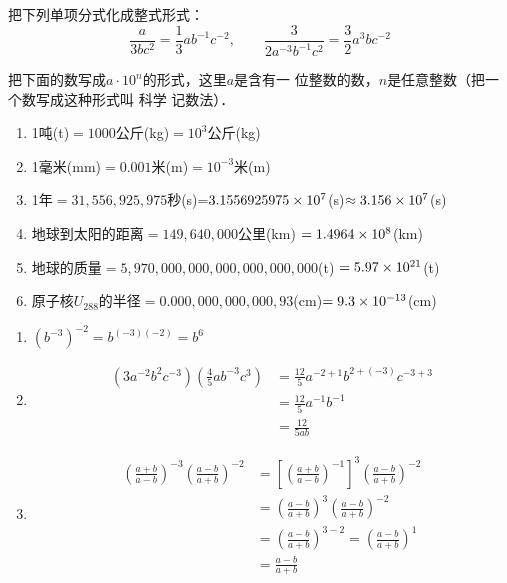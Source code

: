 \begin{example}
    把下列单项分式化成整式形式：
    \[\frac{a}{3bc^2}=\frac{1}{3}ab^{-1}c^{-2},\qquad \frac{3}{2a^{-3}b^{-1}c^2}=\frac{3}{2}a^3bc^{-2}  \]
\end{example}

\begin{example}
    把下面的数写成$a\cdot 10^n$的形式，这里$a$是含有一
位整数的数，$n$是任意整数（把一个数写成这种形式叫 科学
记数法）．
    \begin{enumerate}
        \item 1吨(t)$=1000$公斤(kg)$=10^3$公斤(kg)
        \item  1毫米(mm)$=0.001$米(m)$=10^{-3}$米(m)
        \item  1年$=31,556,925,975$秒(s)=$3.1556925975\times10^7$(s)$\approx 3.156\times10^7$(s)
        \item   地球到太阳的距离$=149,640,000$公里(km)
        $=1.4964\times10^8$(km)
        \item    地球的质量$=5,970,000,000,000,000,000,000$(t)
        $=5.97\times10^{21}$(t)
        \item    原子核$U_{288}$的半径$=0.000,000,000,000,93$(cm)$=9.3\times10^{-13}$(cm)
    \end{enumerate}
\end{example}

\begin{example}
\begin{enumerate}
    \item $(b^{-3})^{-2}=b^{(-3)(-2)}=b^6$
    \item \[\begin{split}
        \left(3a^{-2}b^2c^{-3}\right)\left(\frac{4}{5}ab^{-3}c^3\right)&=\frac{12}{5}a^{-2+ 1}b^{2+(-3)}c^{-3+3}\\
        &=\frac{12}{5}a^{-1}b^{-1}\\
        &=\frac{12}{5ab}
    \end{split}\]
    \item \[\begin{split}
        \left(\frac{a+b}{a-b}\right)^{-3}\left(\frac{a-b}{a+b}\right)^{-2}&=\left[\left(\frac{a+b}{a-b}\right)^{-1}\right]^{3} \left(\frac{a-b}{a+b}\right)^{-2}\\
        &=\left(\frac{a-b}{a+b}\right)^{3}\left(\frac{a-b}{a+b}\right)^{-2}\\
        &=\left(\frac{a-b}{a+b}\right)^{3-2}=\left(\frac{a-b}{a+b}\right)^{1}\\
        &=\frac{a-b}{a+b}
    \end{split}\]
\end{enumerate}
\end{example}

